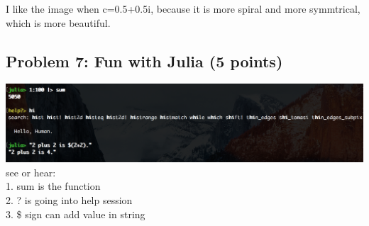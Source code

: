 \documentclass[]{article}
\begin{document}
  I like the image when c=0.5+0.5i, because it is more spiral and more symmtrical, which is more beautiful.
  














\subsection{Problem 7: Fun with Julia (5
points)}\label{problem-7-fun-with-julia-5-points}


\includegraphics[scale=0.8]{7}
see or hear:\\

1. sum is the function \\

2. ? is going into help session \\

3. \$ sign can add value in string\\
\end{document}
